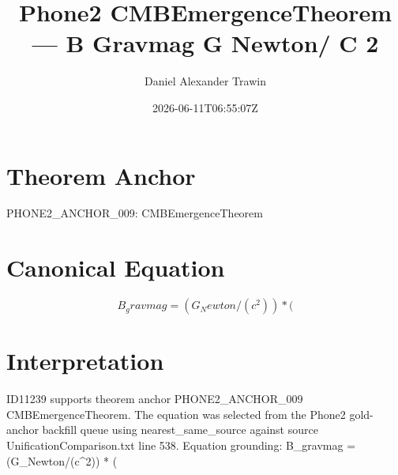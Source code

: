 \documentclass[11pt]{article}
\title{Phone2 CMBEmergenceTheorem — B Gravmag G Newton/ C 2}
\author{Daniel Alexander Trawin}
\date{2026-06-11T06:55:07Z}
\begin{document}
\maketitle
\section*{Theorem Anchor}
PHONE2_ANCHOR_009: CMBEmergenceTheorem
\section*{Canonical Equation}
\[
B_gravmag = (G_Newton/(c^2)) * (
\]
\section*{Interpretation}
ID11239 supports theorem anchor PHONE2_ANCHOR_009 CMBEmergenceTheorem. The equation was selected from the Phone2 gold-anchor backfill queue using nearest_same_source against source UnificationComparison.txt line 538. Equation grounding: B_gravmag = (G_Newton/(c^2)) * (
\end{document}
